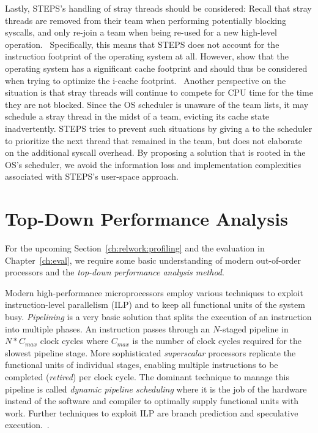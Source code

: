 \documentclass[12pt,a4paper]{book}
\begin{document}
Lastly, STEPS's handling of stray threads should be considered:
Recall that stray threads are removed from their team when performing potentially blocking syscalls, and only re-join a team when being re-used for a new high-level operation.~\cite{steps}
Specifically, this means that STEPS does not account for the instruction footprint of the operating system at all.
However, \citeauthor*{osCacheFootprint} show that the operating system has a significant cache footprint and should thus be considered when trying to optimize the i-cache footprint.~\cite{osCacheFootprint,compspr} %
Another perspective on the situation is that stray threads will continue to compete for CPU time for the time they are not blocked.
Since the OS scheduler is unaware of the team lists, it may schedule a stray thread in the midst of a team, evicting its cache state inadvertently.
STEPS tries to prevent such situations by giving a  to the scheduler to prioritize the next thread that remained in the team, but does not elaborate on the additional syscall overhead.
By proposing a solution that is rooted in the OS's scheduler, we avoid the information loss and implementation complexities associated with STEPS's user-space approach.

\section{Top-Down Performance Analysis}\label{ch:relwork:topdown}
For the upcoming Section~\ref{ch:relwork:profiling} and the evaluation in Chapter~\ref{ch:eval}, we require some basic understanding of modern out-of-order processors and the \emph{top-down performance analysis method}.

Modern high-performance microprocessors employ various techniques to exploit instruction-level parallelism (ILP) and to keep all functional units of the system busy.
\emph{Pipelining} is a very basic solution that splits the execution of an instruction into multiple phases. An instruction passes through an $N$-staged pipeline in $N * C_{max}$ clock cycles where $C_{max}$ is the number of clock cycles required for the slowest pipeline stage.
More sophisticated \emph{superscalar} processors replicate the functional units of individual stages, enabling multiple instructions to be completed (\emph{retired}) per clock cycle.
The dominant technique to manage this pipeline is called \emph{dynamic pipeline scheduling} where it is the job of the hardware instead of the software and compiler to optimally supply functional units with work.
Further techniques to exploit ILP are branch prediction and speculative execution.~\cite{hennessy2002DynamicPipeline}.
\end{document}
